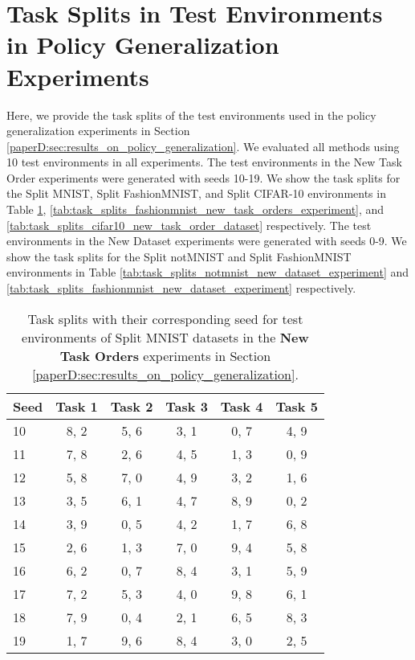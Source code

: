 
\section{Task Splits in Test Environments in Policy Generalization Experiments}\label{paperD:app:task_split_tables}

Here, we provide the task splits of the test environments used in the policy generalization experiments in Section \ref{paperD:sec:results_on_policy_generalization}. We evaluated all methods using 10 test environments in all experiments.
The test environments in the New Task Order experiments were generated with seeds 10-19. We show the task splits for the Split MNIST, Split FashionMNIST, and Split CIFAR-10 environments in Table \ref{tab:task_splits_mnist_new_task_orders_experiment}, \ref{tab:task_splits_fashionmnist_new_task_orders_experiment}, and \ref{tab:task_splits_cifar10_new_task_order_dataset} respectively. 
The test environments in the New Dataset experiments were generated with seeds 0-9. We show the task splits for the Split notMNIST and Split FashionMNIST environments in Table \ref{tab:task_splits_notmnist_new_dataset_experiment} and \ref{tab:task_splits_fashionmnist_new_dataset_experiment} respectively. 



\begin{table}[h]
    \centering
    \small
    \caption{Task splits with their corresponding seed for test environments of Split MNIST datasets in the {\bf New Task Orders} experiments in Section \ref{paperD:sec:results_on_policy_generalization}. }
    \vspace{-2mm}
    \begin{tabular}{l c c c c c}
        \toprule %
         {\bf Seed} & {\bf Task 1} & {\bf Task 2} & {\bf Task 3} & {\bf Task 4} & {\bf Task 5} \\
        \midrule
        10 & 8, 2 & 5, 6 & 3, 1 & 0, 7 & 4, 9   \\ \midrule 
        11 & 7, 8 & 2, 6 & 4, 5 & 1, 3 & 0, 9  \\ \midrule 
        12 & 5, 8 & 7, 0 & 4, 9 & 3, 2 & 1, 6  \\ \midrule 
        13 & 3, 5 & 6, 1 & 4, 7 & 8, 9 & 0, 2  \\ \midrule
        14 & 3, 9 & 0, 5 & 4, 2 & 1, 7 & 6, 8  \\ \midrule 
        15 & 2, 6 & 1, 3 & 7, 0 & 9, 4 & 5, 8   \\ \midrule
        16 & 6, 2 & 0, 7 & 8, 4 & 3, 1 & 5, 9   \\ \midrule
        17 & 7, 2 & 5, 3 & 4, 0 & 9, 8 & 6, 1  \\ \midrule 
        18 & 7, 9 & 0, 4 & 2, 1 & 6, 5 & 8, 3  \\ \midrule
        19 & 1, 7 & 9, 6 & 8, 4 & 3, 0 & 2, 5   \\
        \bottomrule %
    \end{tabular}
    \label{tab:task_splits_mnist_new_task_orders_experiment}
\end{table}


